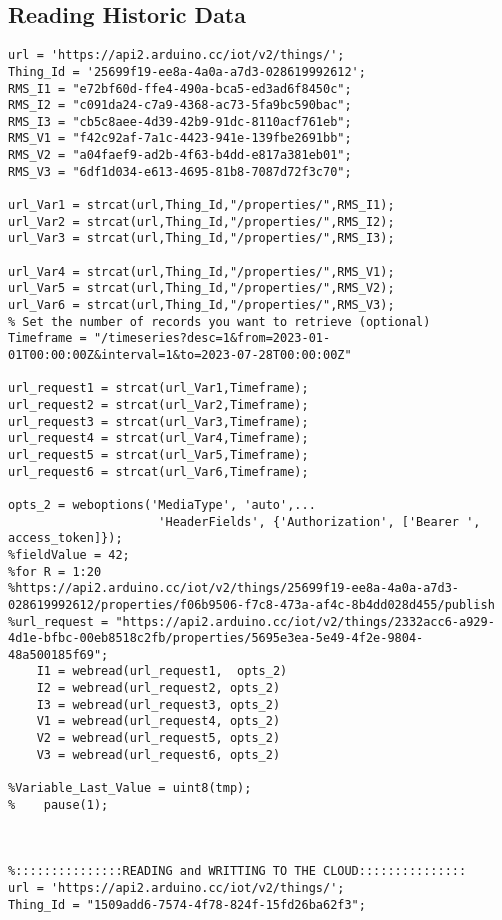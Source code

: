 \subsection*{Reading Historic Data}
\label{Historic Data}
\begin{lstlisting}[style=Matlab-Pyglike]
url = 'https://api2.arduino.cc/iot/v2/things/';
Thing_Id = '25699f19-ee8a-4a0a-a7d3-028619992612';
RMS_I1 = "e72bf60d-ffe4-490a-bca5-ed3ad6f8450c";
RMS_I2 = "c091da24-c7a9-4368-ac73-5fa9bc590bac";
RMS_I3 = "cb5c8aee-4d39-42b9-91dc-8110acf761eb";
RMS_V1 = "f42c92af-7a1c-4423-941e-139fbe2691bb";
RMS_V2 = "a04faef9-ad2b-4f63-b4dd-e817a381eb01";
RMS_V3 = "6df1d034-e613-4695-81b8-7087d72f3c70";

url_Var1 = strcat(url,Thing_Id,"/properties/",RMS_I1);
url_Var2 = strcat(url,Thing_Id,"/properties/",RMS_I2);
url_Var3 = strcat(url,Thing_Id,"/properties/",RMS_I3);

url_Var4 = strcat(url,Thing_Id,"/properties/",RMS_V1);
url_Var5 = strcat(url,Thing_Id,"/properties/",RMS_V2);
url_Var6 = strcat(url,Thing_Id,"/properties/",RMS_V3);
% Set the number of records you want to retrieve (optional)
Timeframe = "/timeseries?desc=1&from=2023-01-01T00:00:00Z&interval=1&to=2023-07-28T00:00:00Z"

url_request1 = strcat(url_Var1,Timeframe);
url_request2 = strcat(url_Var2,Timeframe);
url_request3 = strcat(url_Var3,Timeframe);
url_request4 = strcat(url_Var4,Timeframe);
url_request5 = strcat(url_Var5,Timeframe);
url_request6 = strcat(url_Var6,Timeframe);

opts_2 = weboptions('MediaType', 'auto',...
                     'HeaderFields', {'Authorization', ['Bearer ', access_token]});
%fieldValue = 42;
%for R = 1:20
%https://api2.arduino.cc/iot/v2/things/25699f19-ee8a-4a0a-a7d3-028619992612/properties/f06b9506-f7c8-473a-af4c-8b4dd028d455/publish
%url_request = "https://api2.arduino.cc/iot/v2/things/2332acc6-a929-4d1e-bfbc-00eb8518c2fb/properties/5695e3ea-5e49-4f2e-9804-48a500185f69";
    I1 = webread(url_request1,  opts_2)
    I2 = webread(url_request2, opts_2)
    I3 = webread(url_request3, opts_2)
    V1 = webread(url_request4, opts_2)
    V2 = webread(url_request5, opts_2)
    V3 = webread(url_request6, opts_2)

%Variable_Last_Value = uint8(tmp);
%    pause(1);



%:::::::::::::::READING and WRITTING TO THE CLOUD:::::::::::::::
url = 'https://api2.arduino.cc/iot/v2/things/';
Thing_Id = "1509add6-7574-4f78-824f-15fd26ba62f3";


\end{lstlisting}
